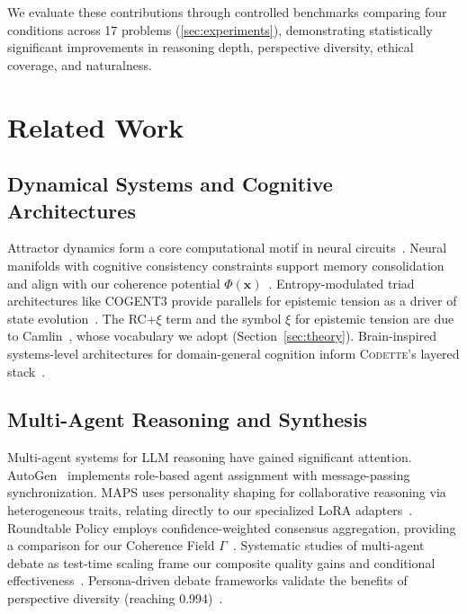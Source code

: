 \documentclass[11pt,a4paper]{article}
\newcommand{\codette}{\textsc{Codette}}
\begin{document}
We evaluate these contributions through controlled benchmarks comparing four
conditions across 17 problems (\cref{sec:experiments}), demonstrating
statistically significant improvements in reasoning depth, perspective
diversity, ethical coverage, and naturalness.

\section{Related Work}
\label{sec:related}

\subsection{Dynamical Systems and Cognitive Architectures}
Attractor dynamics form a core computational motif in neural
circuits~\citep{fakhoury2025models}. Neural manifolds with cognitive
consistency constraints support memory consolidation and align with our
coherence potential $\Phi(\mathbf{x})$~\citep{nguyen2025neural}.
Entropy-modulated triad architectures like COGENT3 provide parallels for
epistemic tension as a driver of state
evolution~\citep{salazar2025cogent3}. The RC+$\xi$ term and the symbol $\xi$
for epistemic tension are due to Camlin~\citep{camlin2025consciousness}, whose
vocabulary we adopt (Section~\ref{sec:theory}). Brain-inspired systems-level
architectures for domain-general cognition inform \codette{}'s layered
stack~\citep{achterberg2023building}.

\subsection{Multi-Agent Reasoning and Synthesis}
Multi-agent systems for LLM reasoning have gained significant attention.
AutoGen~\citep{wu2023autogen} implements role-based agent assignment with
message-passing synchronization. MAPS uses personality shaping for
collaborative reasoning via heterogeneous traits, relating directly to our
specialized LoRA adapters~\citep{zhang2025maps}. Roundtable Policy employs
confidence-weighted consensus aggregation, providing a comparison for our
Coherence Field $\Gamma$~\citep{yao2025roundtable}. Systematic studies of
multi-agent debate as test-time scaling frame our composite quality gains and
conditional effectiveness~\citep{yang2025revisiting}. Persona-driven debate
frameworks validate the benefits of perspective diversity (reaching
0.994)~\citep{hu2025debate}.
\end{document}

